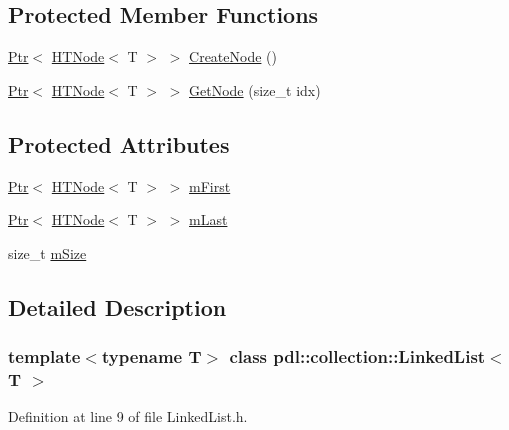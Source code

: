 \subsection*{Protected Member Functions}
\begin{DoxyCompactItemize}
\item 
\mbox{\hyperlink{classpdl_1_1memory_1_1_ptr}{Ptr}}$<$ \mbox{\hyperlink{classpdl_1_1collection_1_1_h_t_node}{H\+T\+Node}}$<$ T $>$ $>$ \mbox{\hyperlink{classpdl_1_1collection_1_1_linked_list_a1cf7dc015f110f3a287b85f8e5cbcbeb}{Create\+Node}} ()
\item 
\mbox{\hyperlink{classpdl_1_1memory_1_1_ptr}{Ptr}}$<$ \mbox{\hyperlink{classpdl_1_1collection_1_1_h_t_node}{H\+T\+Node}}$<$ T $>$ $>$ \mbox{\hyperlink{classpdl_1_1collection_1_1_linked_list_ae3dd2c2ba1b4e01fa3b5685d933a4ab5}{Get\+Node}} (size\+\_\+t idx)
\end{DoxyCompactItemize}
\subsection*{Protected Attributes}
\begin{DoxyCompactItemize}
\item 
\mbox{\hyperlink{classpdl_1_1memory_1_1_ptr}{Ptr}}$<$ \mbox{\hyperlink{classpdl_1_1collection_1_1_h_t_node}{H\+T\+Node}}$<$ T $>$ $>$ \mbox{\hyperlink{classpdl_1_1collection_1_1_linked_list_addbc44970dd86c1612ff342fd8d6678e}{m\+First}}
\item 
\mbox{\hyperlink{classpdl_1_1memory_1_1_ptr}{Ptr}}$<$ \mbox{\hyperlink{classpdl_1_1collection_1_1_h_t_node}{H\+T\+Node}}$<$ T $>$ $>$ \mbox{\hyperlink{classpdl_1_1collection_1_1_linked_list_a4a9717f1b3412f636c16ec7b5654376f}{m\+Last}}
\item 
size\+\_\+t \mbox{\hyperlink{classpdl_1_1collection_1_1_linked_list_ad15deaf5bbdc32d4efe316468f9a5f32}{m\+Size}}
\end{DoxyCompactItemize}


\subsection{Detailed Description}
\subsubsection*{template$<$typename T$>$\newline
class pdl\+::collection\+::\+Linked\+List$<$ T $>$}



Definition at line 9 of file Linked\+List.\+h.



